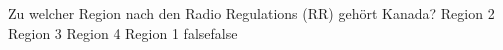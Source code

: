     {Zu welcher Region nach den Radio Regulations (RR) gehört Kanada?}
    {Region 2}
    {Region 3}
    {Region 4}
    {Region 1}
    {false}{false}